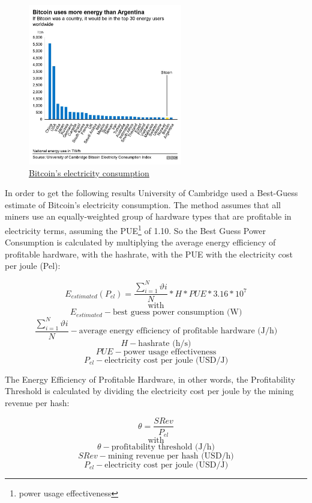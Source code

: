 \documentclass{article}
\begin{document}
\begin{figure}[H]
    \begin{center}
        \includegraphics[width=0.6\textwidth]{images/bitcoin_costs.png}
        \caption{\href{https://www.bbc.com/news/technology-56012952}{\underline{Bitcoin’s electricity consumption}}}
    \end{center}
\end{figure}

In order to  get the following results University of Cambridge used a Best-Guess estimate of Bitcoin’s electricity consumption. The method assumes that all miners use an equally-weighted group of hardware types that are profitable in electricity terms, assuming the PUE\footnote{power usage effectiveness} of 1.10. So the Best Guess Power Consumption is calculated by multiplying the average energy efficiency of profitable hardware, with the hashrate, with the PUE with the electricity cost per joule (Pel):

\[E_{estimated}(P_{el}) = \frac{\sum_{i=1}^{N} \vartheta i}{N} * H * PUE * 3.16 * 10^7\]
\[\mbox{with}\]
\[E_{estimated} - \mbox{best guess power consumption (W)}\]
\[\frac{\sum_{i=1}^{N} \vartheta i}{N} - \mbox{average energy efficiency of profitable hardware (J/h)}\]
\[H - \mbox{hashrate (h/s)}\]
\[PUE - \mbox{power usage effectiveness}\]
\[P_{el} - \mbox{electricity cost per joule (USD/J)}\]

The Energy Efficiency of Profitable Hardware, in other words, the Profitability Threshold is calculated by dividing the electricity cost per joule by the mining revenue per hash:

\[\theta = \frac{SRev}{P_{el}}\]
\[\mbox{with}\]
\[\theta - \mbox{profitability threshold (J/h)}\]
\[SRev - \mbox{mining revenue per hash (USD/h)}\]
\[P_{el} - \mbox{electricity cost per joule (USD/J)}\]
\end{document}
